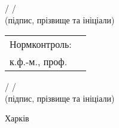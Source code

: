 \begin{titlepage}
\begin{center}
\begin{minipage}{0.58\textwidth}
            \underline{\hspace{2cm}} / \Mentor/\\
            {\scriptsize (підпис, прізвище та ініціали)}

            \vspace*{0.5\baselineskip}

            \begin{minipage}{0.58\textwidth}
                \begin{tabular}{@{}ll}
                 Нормконтроль: & \\
                 к.ф.-м., проф. &\\
                \end{tabular}
            \end{minipage}
            \vspace{0.3\baselineskip}
            
            \underline{\hspace{2cm}} / \Mentor/\\
            {\scriptsize (підпис, прізвище та ініціали)}
        \end{minipage}

        \centering
        \vfill
        Харків \the\year
    \end{center}
\end{titlepage}
\makeatother
\setcounter{page}{2}
